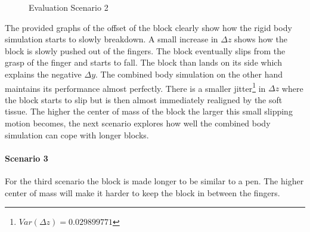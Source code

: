 \begin{figure}[htb]
	\centering
	\caption{Evaluation Scenario 2}
\end{figure}

The provided graphs of the offset of the block clearly show how the rigid body simulation starts to slowly breakdown. A small increase in $\Delta z$ shows how the block is slowly pushed out of the fingers. The block eventually slips from the grasp of the finger and starts to fall. The block than lands on its side which explains the negative $\Delta y$. The combined body simulation on the other hand maintains its performance almost perfectly. There is a smaller jitter\footnote{$Var(\Delta z)=0.029899771$} in $\Delta z$ where the block starts to slip but is then almost immediately realigned by the soft tissue. The higher the center of mass of the block the larger this small slipping motion becomes, the next scenario explores how well the combined body simulation can cope with longer blocks.

\clearpage
\paragraph{Scenario 3}
For the third scenario the block is made longer to be similar to a pen. The higher center of mass will make it harder to keep the block in between the fingers.

